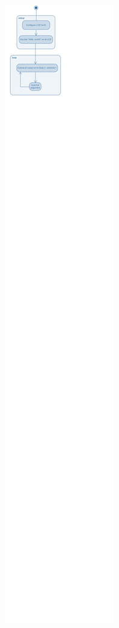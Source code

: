 \documentclass[10pt,a4paper]{article}
\begin{document}
\begin{itemize}
\begin{figure}[hb]
\includegraphics[scale=0.5]{DIAGRAMA DE FLUJO.png}
\end{figure}
\end{itemize}
\end{document}
